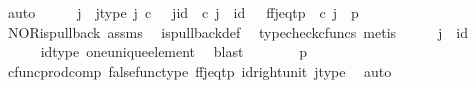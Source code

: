 \begin{isabellebody}
\ auto\isanewline
\ \ \isamarkupfalse%
\ \isamarkupfalse%
\ j\ \ j{\isacharunderscore}{\kern0pt}type{\isacharcolon}{\kern0pt}\ {\isachardoublequoteopen}j\ {\isasymin}\isactrlsub c\ {\isasymone}{\isachardoublequoteclose}\ \ j{\isacharunderscore}{\kern0pt}id{\isacharcolon}{\kern0pt}\ {\isachardoublequoteopen}{\isasymbeta}\isactrlbsub {\isasymone}\isactrlesub \ {\isasymcirc}\isactrlsub c\ j\ {\isacharequal}{\kern0pt}\ id\ {\isasymone}{\isachardoublequoteclose}\ \ ff{\isacharunderscore}{\kern0pt}j{\isacharunderscore}{\kern0pt}eq{\isacharunderscore}{\kern0pt}tp{\isacharcolon}{\kern0pt}\ {\isachardoublequoteopen}{\isasymlangle}{\isasymf}{\isacharcomma}{\kern0pt}{\isasymf}{\isasymrangle}\ {\isasymcirc}\isactrlsub c\ j\ {\isacharequal}{\kern0pt}\ {\isasymlangle}{\isasymt}{\isacharcomma}{\kern0pt}p{\isasymrangle}{\isachardoublequoteclose}\isanewline
\ \ \ \ \isamarkupfalse%
\ NOR{\isacharunderscore}{\kern0pt}is{\isacharunderscore}{\kern0pt}pullback\ assms\ \isamarkupfalse%
\ is{\isacharunderscore}{\kern0pt}pullback{\isacharunderscore}{\kern0pt}def\ \isamarkupfalse%
\ {\isacharparenleft}{\kern0pt}typecheck{\isacharunderscore}{\kern0pt}cfuncs{\isacharcomma}{\kern0pt}\ metis{\isacharparenright}{\kern0pt}\isanewline
\ \ \isamarkupfalse%
\ \isamarkupfalse%
\ {\isachardoublequoteopen}j\ {\isacharequal}{\kern0pt}\ id\ {\isasymone}{\isachardoublequoteclose}\isanewline
\ \ \ \ \isamarkupfalse%
\ id{\isacharunderscore}{\kern0pt}type\ one{\isacharunderscore}{\kern0pt}unique{\isacharunderscore}{\kern0pt}element\ \isamarkupfalse%
\ blast\isanewline
\ \ \isamarkupfalse%
\ \isamarkupfalse%
\ {\isachardoublequoteopen}{\isasymlangle}{\isasymf}{\isacharcomma}{\kern0pt}{\isasymf}{\isasymrangle}\ {\isacharequal}{\kern0pt}\ {\isasymlangle}{\isasymt}{\isacharcomma}{\kern0pt}p{\isasymrangle}{\isachardoublequoteclose}\isanewline
\ \ \ \ \isamarkupfalse%
\ cfunc{\isacharunderscore}{\kern0pt}prod{\isacharunderscore}{\kern0pt}comp\ false{\isacharunderscore}{\kern0pt}func{\isacharunderscore}{\kern0pt}type\ ff{\isacharunderscore}{\kern0pt}j{\isacharunderscore}{\kern0pt}eq{\isacharunderscore}{\kern0pt}tp\ id{\isacharunderscore}{\kern0pt}right{\isacharunderscore}{\kern0pt}unit{}\ j{\isacharunderscore}{\kern0pt}type\ \isamarkupfalse%
\ auto\isanewline
\ \ \isamarkupfalse%
\ \isamarkupfalse%

\end{isabellebody}
